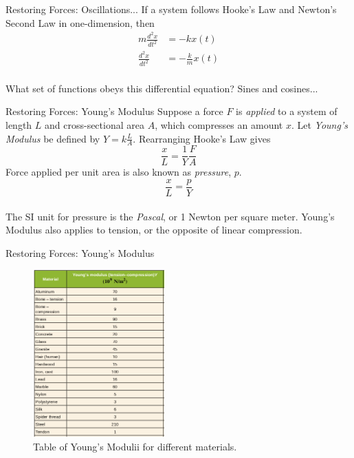\documentclass{beamer}
\begin{document}
\begin{frame}{Restoring Forces: Oscillations...}
If a system follows Hooke's Law and Newton's Second Law in one-dimension, then \\
\begin{align}
m \frac{d^2x}{dt^2} &= -k x(t) \label{eq:osc1} \\
\frac{d^2x}{dt^2} &= -\frac{k}{m} x(t) \label{eq:osc2}
\end{align} \\
What set of functions obeys this differential equation?  Sines and cosines...
\end{frame}

\begin{frame}{Restoring Forces: Young's Modulus}
Suppose a force $F$ is \textit{applied} to a system of length $L$ and cross-sectional area $A$, which compresses an amount $x$.  Let \textit{Young's Modulus} be defined by $Y = k \frac{L}{A}$.  Rearranging Hooke's Law  gives \\
\begin{equation}
\frac{x}{L} = \frac{1}{Y}\frac{F}{A}
\end{equation}
\vspace{0.5cm}
Force applied per unit area is also known as \textit{pressure}, $p$.
\begin{equation}
\boxed{\frac{x}{L} = \frac{p}{Y}}
\label{eq:young}
\end{equation} \\
The SI unit for pressure is the \textit{Pascal}, or 1 Newton per square meter.  Young's Modulus also applies to tension, or the opposite of linear compression.
\end{frame}

\begin{frame}{Restoring Forces: Young's Modulus}
\begin{figure}
\centering
\includegraphics[width=0.45\textwidth]{figures/young.png}
\caption{\label{fig:young} Table of Young's Modulii for different materials.}
\end{figure}
\end{frame}
\end{document}
